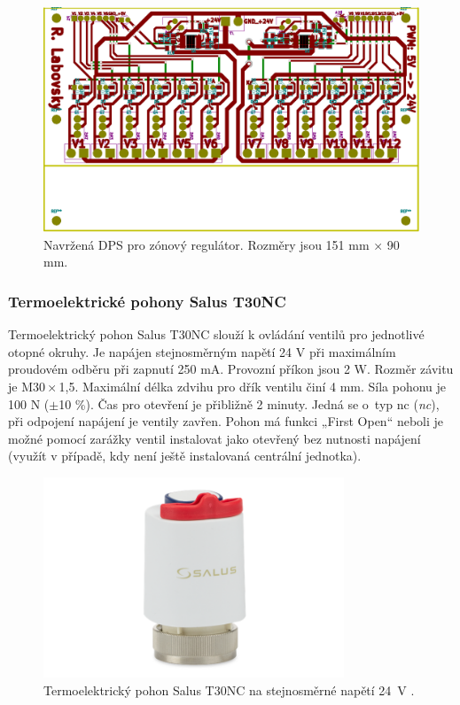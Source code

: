 \begin{figure}[H]
    \centering
    \includegraphics[width=\textwidth]{images/svg/kicad/dps-zonovy-regulator.eps}
    \caption[Navržená DPS pro zónový regulátor.]{Navržená DPS pro zónový regulátor. Rozměry jsou 151 mm × 90 mm.}
    \label{fig:dps-zonovy-regulator}
\end{figure}

\subsubsection{Termoelektrické pohony Salus T30NC}  
Termoelektrický pohon Salus T30NC slouží k ovládání ventilů pro jednotlivé otopné okruhy. Je napájen stejnosměrným napětí 24 V při maximálním proudovém odběru při zapnutí 250 mA. Provozní příkon jsou 2 W. Rozměr závitu je M30\,×\,1,5. Maximální délka zdvihu pro dřík ventilu činí 4 mm. Síla pohonu je 100 N ($\pm$10 \%). Čas pro otevření je přibližně 2 minuty. Jedná se o~typ \acrshort{nc} (\textit{\acrlong{nc}}), při odpojení napájení je ventily zavřen. Pohon má funkci „First Open“ neboli je možné pomocí zarážky ventil instalovat jako otevřený bez nutnosti napájení (využít v případě, kdy není ještě instalovaná centrální jednotka).

\begin{figure}[H]
    \centering
    \includegraphics[width=0.8\textwidth]{images/termoelektricky-pohon-salus-t30nc-24-v.png}
    \caption[Termoelektrický pohon Salus T30NC na stejnosměrné napětí 24 V.]{Termoelektrický pohon Salus T30NC na stejnosměrné napětí 24~V \cite{termoelektricky-pohon-t30nc}.}
    \label{fig:termoelektricky-pohon-salus-t30nc-24-v}
\end{figure}

